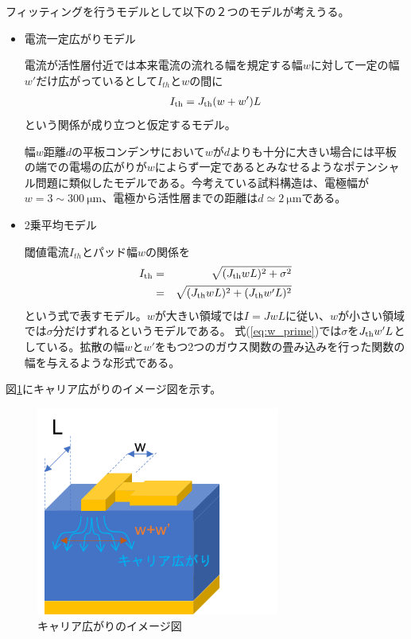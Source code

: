フィッティングを行うモデルとして以下の２つのモデルが考えうる。
\begin{itemize}
\item 電流一定広がりモデル  

電流が活性層付近では本来電流の流れる幅を規定する幅$w$に対して一定の幅$w'$だけ広がっているとして$I_{th}$と$w$の間に
\begin{eqnarray}
I_{\rm{th}}=J_{\rm{th}}(w+w')L
\label{eq:denryu_hirogari}
\end{eqnarray}
という関係が成り立つと仮定するモデル。


幅$w$距離$d$の平板コンデンサにおいて$w$が$d$よりも十分に大きい場合には平板の端での電場の広がりが$w$によらず一定であるとみなせるようなポテンシャル問題に類似したモデルである。今考えている試料構造は、電極幅が$w=3\sim 300\ \si{\micro\metre}$、電極から活性層までの距離は$d\simeq 2\ \si{\micro\metre}$である。
\item 2乗平均モデル

閾値電流$I_{th}$とパッド幅$w$の関係を
\begin{eqnarray}
I_{\rm{th}}&=&\sqrt{(J_{\rm{th}}wL)^2+\sigma^2}\\
&=&\sqrt{(J_{\rm{th}}wL)^2+(J_{\rm{th}}w'L)^2}
\label{eq:w_prime}
\end{eqnarray}
という式で表すモデル。$w$が大きい領域では$I=JwL$に従い、$w$が小さい領域では$\sigma$分だけずれるというモデルである。
式(\ref{eq:w_prime})では$\sigma$を$J_{\rm{th}}w'L$としている。拡散の幅$w$と$w'$をもつ2つのガウス関数の畳み込みを行った関数の幅を与えるような形式である。
\end{itemize}
図\ref{fig:fig_3_1_w_prime_figure}にキャリア広がりのイメージ図を示す。
\begin{figure}[h]
	\centering
	\includegraphics[width=8cm]{figure/fig_3_1_w_prime_figure.png}
	\caption{キャリア広がりのイメージ図}
	\label{fig:fig_3_1_w_prime_figure}
\end{figure}




